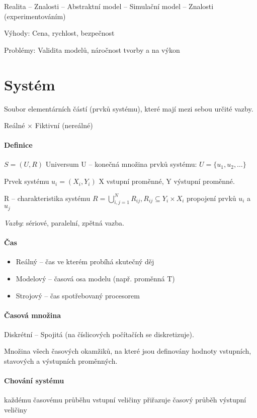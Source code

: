\documentclass[a4wide]{report}
\begin{document}
Realita -- Znalosti -- Abstraktní model -- Simulační model -- Znalosti (experimentováním)

Výhody: Cena, rychlost, bezpečnost

Problémy: Validita modelů, náročnost tvorby a na výkon

\section{Systém}
Soubor elementárních částí (prvků systému), které mají mezi sebou určité vazby.

Reálné $\times$ Fiktivní (nereálné)

\paragraph{Definice}
$S = (U, R)$ Universum U -- konečná množina prvků systému: $U = \{u_1, u_2, \dots \}$

Prvek systému $u_i = (X_i, Y_i)$ X vstupní proměnné, Y výstupní proměnné.

R -- charakteristika systému $R = \bigcup^N_{i,j = 1} R_{ij}, R_{ij} \subseteq Y_i \times X_i$ propojení prvků $u_i$ a $u_j$

\emph{Vazby}: sériové, paralelní, zpětná vazba.

\paragraph{Čas}
\begin{itemize}
	\item Reálný -- čas ve kterém probíhá skutečný děj
	\item Modelový -- časová osa modelu (např. proměnná T)
	\item Strojový -- čas spotřebovaný procesorem
\end{itemize}

\paragraph{Časová množina}
Diskrétní -- Spojitá (na číslicových počítačích se diskretizuje).

Množina všech časových okamžiků, na které jsou definovány hodnoty vstupních, stavových a výstupních proměnných.

\paragraph{Chování systému}
každému časovému průběhu vstupní veličiny přiřazuje časový průběh výstupní veličiny
\end{document}
